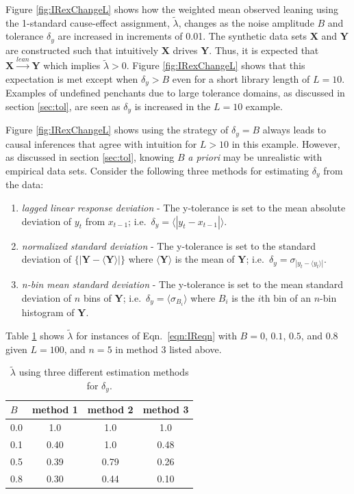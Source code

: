 \documentclass[twocolumn,aps,pre,groupedaddress]{revtex4-1}
\begin{document}
Figure \ref{fig:IRexChangeL} shows how the weighted mean observed leaning using the 1-standard cause-effect assignment, $\tilde{\lambda}$, changes as the noise amplitude $B$ and tolerance $\delta_y$ are increased in increments of 0.01.  The synthetic data sets $\mathbf{X}$ and $\mathbf{Y}$ are constructed such that intuitively $\mathbf{X}$ drives $\mathbf{Y}$.  Thus, it is expected that $\mathbf{X}\xrightarrow{lean}\mathbf{Y}$ which implies $\tilde{\lambda} > 0$.  Figure \ref{fig:IRexChangeL} shows that this expectation is met except when $\delta_y > B$ even for a short library length of $L=10$.  Examples of undefined penchants due to large tolerance domains, as discussed in section \ref{sec:tol}, are seen as $\delta_y$ is increased in the $L=10$ example.

Figure \ref{fig:IRexChangeL} shows using the strategy of $\delta_y = B$ always leads to causal inferences that agree with intuition for $L>10$ in this example.  However, as discussed in section \ref{sec:tol}, knowing $B$ {\em a priori} may be unrealistic with empirical data sets.  Consider the following three methods for estimating $\delta_y$ from the data:
\begin{enumerate}
\item {\em lagged linear response deviation} - The y-tolerance is set to the mean absolute deviation of $y_t$ from $x_{t-1}$; i.e.\ $\delta_y = \langle|y_t-x_{t-1}|\rangle$.
\item {\em normalized standard deviation} - The y-tolerance is set to the standard deviation of $\{|\mathbf{Y}-\langle\mathbf{Y}\rangle|\}$ where $\langle\mathbf{Y}\rangle$ is the mean of $\mathbf{Y}$; i.e.\ $\delta_y = \sigma_{|y_t-\langle y_t\rangle|}$.
\item {\em n-bin mean standard deviation} - The y-tolerance is set to the mean standard deviation of $n$ bins of $\mathbf{Y}$; i.e.\ $\delta_y = \langle \sigma_{B_i}\rangle$ where $B_i$ is the $i$th bin of an $n$-bin histogram of $\mathbf{Y}$.    
\end{enumerate}  
Table \ref{tab:IRlagTolComp} shows $\tilde{\lambda}$ for instances of Eqn.\ \ref{eqn:IReqn} with $B = 0$, $0.1$, $0.5$, and $0.8$ given $L=100$, and $n=5$ in method 3 listed above.
\begin{table}
\begin{tabular}{lccc}
$B$ & method 1 & method 2 & method 3\\
\hline
0.0 & 1.0 & 1.0 & 1.0\\
0.1 & 0.40 & 1.0 & 0.48\\
0.5 & 0.39 & 0.79 & 0.26\\
0.8 & 0.30 & 0.44 & 0.10\\
\end{tabular}
\caption{$\tilde{\lambda}$ using three different estimation methods for $\delta_y$.}
\label{tab:IRlagTolComp}
\end{table}
\end{document}
